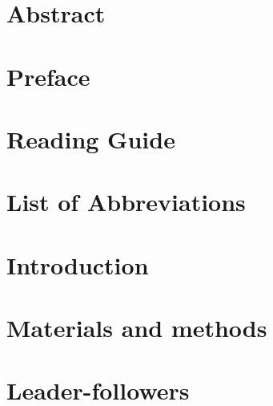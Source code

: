 \documentclass[11pt,twoside,a4paper]{report}
\begin{document}
\setcounter{page}{1}



%



\setcounter{page}{1} %

\listoftodos
    \setcounter{tocdepth}{2}

\chapter*{Abstract}

\newpage
\chapter*{Preface}


\newpage
\renewcommand\contentsname{Table of Contents}
\tableofcontents
\newpage

\chapter*{Reading Guide}



\setcounter{page}{1} %
%

\chapter{List of Abbreviations}


\chapter{Introduction}\label{chp:Intro}


\chapter{Materials and methods}


\chapter{Leader-followers}\label{chp:Hardware}

\end{document}
